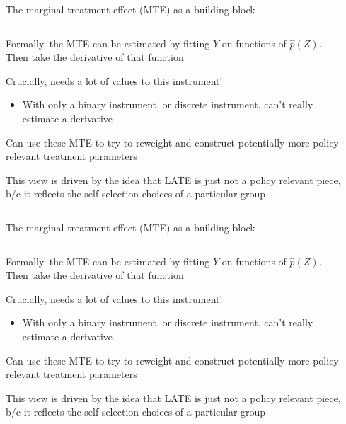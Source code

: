 \documentclass[notes,11pt, aspectratio=169]{beamer}
\newenvironment{wideitemize}{\itemize\addtolength{\itemsep}{10pt}}{\enditemize}
\begin{document}
\begin{frame}{The marginal treatment effect (MTE) as a building block}
  \begin{columns}[T] %
    \begin{column}{0.7\textwidth}
      \begin{wideitemize}
      \item Formally, the MTE can be estimated by fitting $Y$ on
        functions of $\hat{p}(Z)$. Then take the derivative of that
        function
      \item Crucially, needs a lot of values to this instrument!
        \begin{itemize}
        \item With only a binary instrument, or discrete instrument,
          can't really estimate a derivative
        \end{itemize}
      \item Can use these MTE to try to reweight and construct
        potentially more policy relevant treatment parameters
      \item This view is driven by the idea that LATE is just not a
        policy relevant piece, b/c it reflects the self-selection
        choices of a particular group
      \end{wideitemize}
\end{column}
\begin{column}{0.5\textwidth}
\end{column}
\end{columns}
\end{frame}

\begin{frame}{The marginal treatment effect (MTE) as a building block}
  \begin{columns}[T] %
    \begin{column}{0.7\textwidth}
      \begin{wideitemize}
      \item Formally, the MTE can be estimated by fitting $Y$ on
        functions of $\hat{p}(Z)$. Then take the derivative of that
        function
      \item Crucially, needs a lot of values to this instrument!
        \begin{itemize}
        \item With only a binary instrument, or discrete instrument,
          can't really estimate a derivative
        \end{itemize}
      \item Can use these MTE to try to reweight and construct
        potentially more policy relevant treatment parameters
      \item This view is driven by the idea that LATE is just not a
        policy relevant piece, b/c it reflects the self-selection
        choices of a particular group
      \end{wideitemize}
\end{column}
\begin{column}{0.5\textwidth}
\end{column}
\end{columns}
\end{frame}
\end{document}
